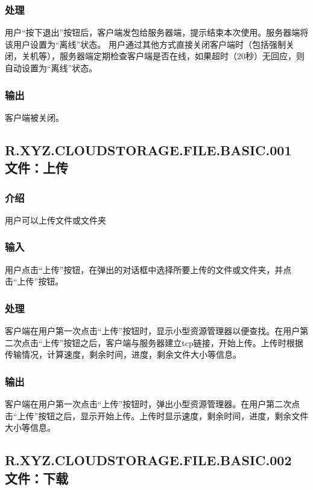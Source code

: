 \subsubsection{处理}
用户“按下退出”按钮后，客户端发包给服务器端，提示结束本次使用。服务器端将该用户设置为“离线”状态。
用户通过其他方式直接关闭客户端时（包括强制关闭，关机等），服务器端定期检查客户端是否在线，如果超时（20秒）无回应，则自动设置为“离线”状态。

\subsubsection{输出}
客户端被关闭。


\subsection{R.XYZ.CLOUDSTORAGE.FILE.BASIC.001 文件：上传}

\subsubsection{介绍}
用户可以上传文件或文件夹

\subsubsection{输入}
用户点击“上传”按钮，在弹出的对话框中选择所要上传的文件或文件夹，并点击“上传”按钮。

\subsubsection{处理}
客户端在用户第一次点击“上传”按钮时，显示小型资源管理器以便查找。在用户第二次点击“上传”按钮之后，客户端与服务器建立tcp链接，开始上传。上传时根据传输情况，计算速度，剩余时间，进度，剩余文件大小等信息。

\subsubsection{输出}
客户端在用户第一次点击“上传”按钮时，弹出小型资源管理器。在用户第二次点击“上传”按钮之后，显示开始上传。上传时显示速度，剩余时间，进度，剩余文件大小等信息。




\subsection{R.XYZ.CLOUDSTORAGE.FILE.BASIC.002 文件：下载}


